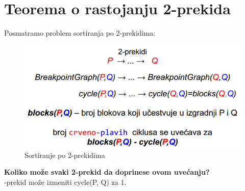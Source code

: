 \newpage
\section{Teorema o rastojanju 2-prekida}
Posmatramo problem sortiranja po 2-prekidima:
\begin{figure}[h!]
\centering
\includegraphics[scale=0.7]{poglavlja/6/slike/sortiranje2prekidi.PNG}
\caption{Sortiranje po 2-prekidima}
\label{slika:X}
\end{figure}

\noindent \textbf{Koliko može svaki 2-prekid da doprinese ovom uvećanju?}\\

-prekid može izmeniti cycle(P, Q) za 1.\\

